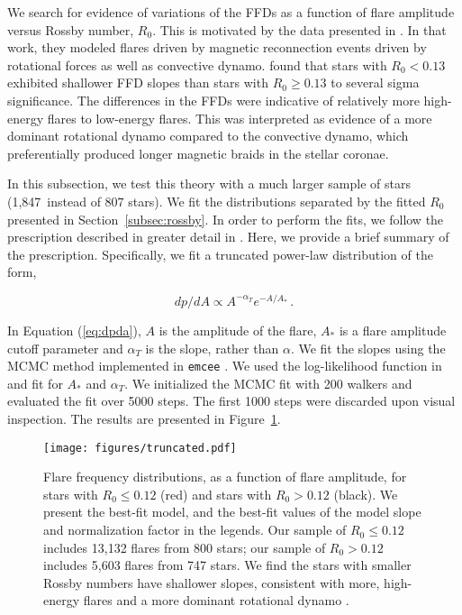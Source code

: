 \documentclass[twocolumn]{aastex631}
\newcommand{\nprot}{1,847}
\begin{document}
We search for evidence of variations of the FFDs as a function of flare amplitude
versus Rossby number, $R_0$. This is motivated by the data  presented in \cite{seligman22}.
In that work, they  modeled flares driven by magnetic reconnection events driven by
rotational forces as well as convective dynamo.  \cite{seligman22} found that stars
with $R_0 < 0.13$ exhibited shallower FFD slopes than stars with $R_0 \geq 0.13$ to
several sigma significance. The differences in the FFDs were indicative of relatively
more high-energy flares to low-energy flares. This was interpreted as evidence of a
more dominant rotational dynamo compared to the convective dynamo, which preferentially
produced longer magnetic braids in the stellar coronae.

In this subsection, we test this theory with a much larger sample of stars (\nprot\
instead of $807$ stars). We fit the distributions separated by the fitted $R_0$
presented in Section~\ref{subsec:rossby}. In order to perform the fits, we follow
the prescription described in greater detail in \cite{seligman22}. Here, we provide
a brief summary of the prescription. Specifically, we fit a truncated power-law
distribution of the form,

\begin{equation}\label{eq:dpda}
  dp/dA \propto A^{-\alpha_T} e^{-A/A_*}\,.
\end{equation}

In Equation (\ref{eq:dpda}),  $A$ is the amplitude of the flare, $A_*$ is a flare
amplitude cutoff parameter and $\alpha_T$ is the slope, rather than $\alpha$. We fit
the slopes using the MCMC method implemented in \texttt{emcee} \citep{goodman10, emcee}.
We used the log-likelihood function in \cite{seligman22} and  fit for $A_*$ and $\alpha_T$.
We initialized the MCMC fit with 200 walkers and evaluated the fit over 5000 steps.
The first 1000 steps were discarded upon visual inspection. The results are presented
in Figure~\ref{fig:truncated}.

\begin{figure}[ht!]
    \begin{centering}
        \texttt{[image: figures/truncated.pdf]}
        \caption{
            Flare frequency distributions, as a function of flare amplitude,
            for stars with $R_0 \leq 0.12$ (red) and stars with $R_0 > 0.12$
            (black). We present the best-fit model, and the best-fit values of
            the model slope and normalization factor in the legends. Our sample
            of $R_0 \leq 0.12$ includes 13,132 flares from 800 stars; our sample
            of $R_0 > 0.12$ includes 5,603 flares from 747 stars. We find the stars
            with smaller Rossby numbers have shallower slopes, consistent with more,
            high-energy flares and a more dominant rotational dynamo \citep{seligman22}.
        }
        \label{fig:truncated}
    \end{centering}
\end{figure}
\end{document}
